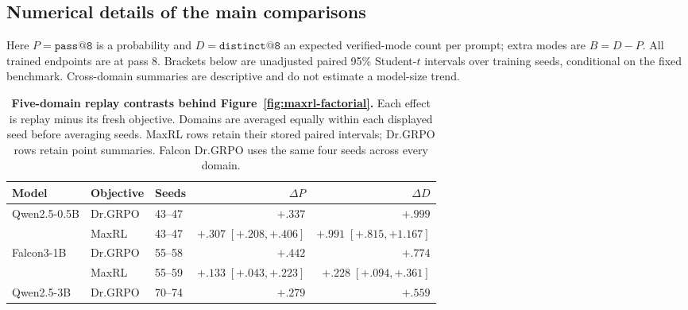 \subsection{Numerical details of the main comparisons}
\label{app:main-numerical-details}

Here $P=\texttt{pass@8}$ is a probability and $D=\texttt{distinct@8}$ an
expected verified-mode count per prompt; extra modes are $B=D-P$.
All trained endpoints are at pass 8. Brackets below are unadjusted paired
95\% Student-$t$ intervals over training seeds, conditional on the fixed
benchmark. Cross-domain summaries are descriptive and do not estimate a
model-size trend.

\begin{table}[H]
  \centering
  \caption{\textbf{Five-domain replay contrasts behind Figure~\ref{fig:maxrl-factorial}.}
  Each effect is replay minus its fresh objective. Domains are averaged
  equally within each displayed seed before averaging seeds. MaxRL rows
  retain their stored paired intervals; Dr.GRPO rows retain point summaries.
  Falcon Dr.GRPO uses the same four seeds across every domain.}
  \label{tab:cross-domain-replay-details}
  \scriptsize
  \setlength{\tabcolsep}{4pt}
  \begin{tabular}{@{}lllrr@{}}
    \toprule
    \textbf{Model} & \textbf{Objective} & \textbf{Seeds}
      & $\Delta P$ & $\Delta D$ \\
    \midrule
    Qwen2.5-0.5B & Dr.GRPO & 43--47 & $+.337$ & $+.999$ \\
     & MaxRL & 43--47 & $+.307\;[+.208,+.406]$ & $+.991\;[+.815,+1.167]$ \\
    Falcon3-1B & Dr.GRPO & 55--58 & $+.442$ & $+.774$ \\
     & MaxRL & 55--59 & $+.133\;[+.043,+.223]$ & $+.228\;[+.094,+.361]$ \\
    Qwen2.5-3B & Dr.GRPO & 70--74 & $+.279$ & $+.559$ \\
    \bottomrule
  \end{tabular}
\end{table}

